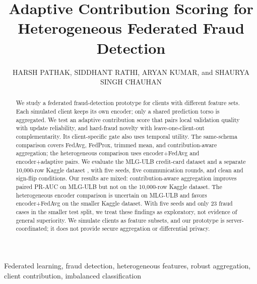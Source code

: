 \documentclass{ieeeaccess}
\begin{document}
\doi{}

\title{Adaptive Contribution Scoring for Heterogeneous Federated Fraud Detection}

\author{\uppercase{Harsh Pathak},
\uppercase{Siddhant Rathi},
\uppercase{Aryan Kumar}, and
\uppercase{Shaurya Singh Chauhan}}
\address[1]{Student, VIT-AP University, Amaravati, Andhra Pradesh, India}

\begin{abstract}
We study a federated fraud-detection prototype for clients with
different feature sets. Each simulated client keeps its own encoder; only a
shared prediction torso is aggregated. We test an adaptive contribution score
that pairs local validation quality with update reliability, and hard-fraud
novelty with leave-one-client-out complementarity. Its client-specific gate
also uses temporal utility. The same-schema comparison covers FedAvg,
FedProx, trimmed mean, and contribution-aware aggregation; the heterogeneous
comparison uses encoder+FedAvg and encoder+adaptive pairs. We evaluate the
MLG-ULB credit-card dataset and a separate 10,000-row Kaggle dataset
\cite{miadul_dataset}, with five seeds, five communication rounds, and clean
and sign-flip conditions. Our results are mixed: contribution-aware aggregation improves
paired PR-AUC on MLG-ULB but not on the 10,000-row Kaggle dataset. The
heterogeneous encoder comparison is uncertain on MLG-ULB and favors
encoder+FedAvg on the smaller Kaggle dataset. With five seeds and only 23
fraud cases in the smaller test split, we treat these findings as exploratory,
not evidence of general superiority. We simulate clients as feature subsets,
and our prototype is server-coordinated; it does not provide secure
aggregation or differential privacy.
\end{abstract}

\begin{keywords}
Federated learning, fraud detection, heterogeneous features, robust
aggregation, client contribution, imbalanced classification
\end{keywords}

\titlepgskip=-15pt

\maketitle
\end{document}

